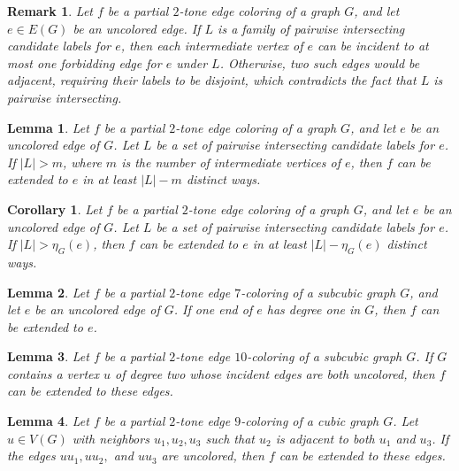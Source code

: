 \documentclass[10pt,a4paper]{amsart}
\newtheorem{remark}{Remark}
\newtheorem{lemma}{Lemma}
\newtheorem{corollary}{Corollary}
\begin{document}
\begin{remark}\label{r2}
Let $f$ be a partial $2$-tone edge coloring of a graph $G$, and let $e\in E(G)$ be an uncolored edge. If $L$ is a family of pairwise intersecting candidate labels for $e$, then each intermediate vertex of $e$ can be incident to at most one forbidding edge for $e$ under $L$. Otherwise, two such edges would be adjacent, requiring their labels to be disjoint, which contradicts the fact that $L$ is pairwise intersecting.
\end{remark}

\begin{lemma}\label{l1}
Let $f$ be a partial $2$-tone edge coloring of a graph $G$, and let $e$ be an uncolored edge of $G$. Let $L$ be a set of pairwise intersecting candidate labels for $e$. If $|L| > m$, where $m$ is the number of intermediate vertices of $e$, then $f$ can be extended to $e$ in at least $|L| - m$ distinct ways.
\end{lemma}

\begin{corollary}\label{x}
Let $f$ be a partial $2$-tone edge coloring of a graph $G$, and let $e$ be an uncolored edge of $G$. Let $L$ be a set of pairwise intersecting candidate labels for $e$. If $|L| > \eta_G(e)$, then $f$ can be extended to $e$ in at least $|L| - \eta_G(e)$ distinct ways.
\end{corollary}

\begin{lemma}\label{l3}
Let $f$ be a partial $2$-tone edge $7$-coloring of a subcubic graph $G$, and let $e$ be an uncolored edge of $G$. If one end of $e$ has degree one in $G$, then $f$ can be extended to $e$.
\end{lemma}

\begin{lemma}\label{l4}
Let $f$ be a partial $2$-tone edge $10$-coloring of a subcubic graph $G$. If $G$ contains a vertex $u$ of degree two whose incident edges are both uncolored, then $f$ can be extended to these edges.
\end{lemma}

\begin{lemma}\label{l5}
Let $f$ be a partial $2$-tone edge $9$-coloring of a cubic graph $G$. Let $u\in V(G)$ with neighbors $u_1, u_2, u_3$ such that $u_2$ is adjacent to both $u_1$ and $u_3$. If the edges $uu_1, uu_2,$ and $uu_3$ are uncolored, then $f$ can be extended to these edges.
\end{lemma}
\end{document}
